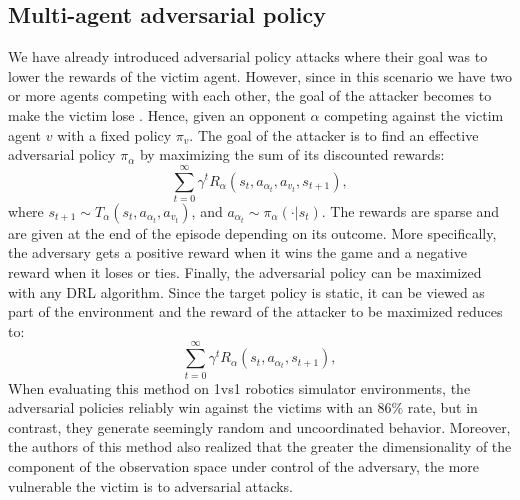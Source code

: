\subsection{Multi-agent adversarial policy}
We have already introduced adversarial policy attacks where their goal was to lower the rewards of the victim agent. However, since in this scenario we have two or more agents competing with each other, the goal of the attacker becomes to make the victim lose \cite{gleave2020adversarial}. Hence, given an opponent \(\alpha\) competing against the victim agent \(v\) with a fixed policy \(\pi_v\). The goal of the attacker is to find an effective adversarial policy \(\pi_\alpha\) by maximizing the sum of its discounted rewards:
\begin{equation}
\sum_{t=0}^{\infty}\gamma^t R_\alpha(s_t,a_{\alpha_t},a_{v_t},s_{t+1}),
\end{equation}
where \(s_{t+1}\sim T_\alpha(s_t,a_{\alpha_t},a_{v_t})\), and \(a_{\alpha_t}\sim\pi_\alpha(\cdot|s_t)\). The rewards are sparse and are given at the end of the episode depending on its outcome. More specifically, the adversary gets a positive reward when it wins the game and a negative reward when it loses or ties. Finally, the adversarial policy can be maximized with any DRL algorithm. Since the target policy is static, it can be viewed as part of the environment and the reward of the attacker to be maximized reduces to:
\begin{equation}
\sum_{t=0}^{\infty}\gamma^t R_\alpha(s_t,a_{\alpha_t},s_{t+1}),
\end{equation}
When evaluating this method on 1vs1 robotics simulator environments, the adversarial policies reliably win against the victims with an 86\% rate, but in contrast, they generate seemingly random and uncoordinated behavior. Moreover, the authors of this method also realized that the greater the dimensionality of the component of the observation space under control of the adversary, the more vulnerable the victim is to adversarial attacks.

